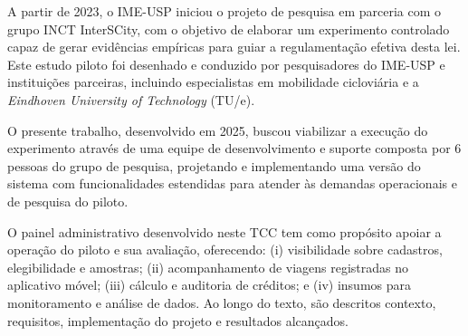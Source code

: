 A partir de 2023, o IME-USP iniciou o projeto de pesquisa em parceria com o
grupo INCT InterSCity, com o objetivo de elaborar um experimento controlado
capaz de gerar evidências empíricas para guiar a regulamentação efetiva desta
lei. Este estudo piloto foi desenhado e conduzido por pesquisadores do IME-USP
e instituições parceiras, incluindo especialistas em mobilidade cicloviária e a
\emph{Eindhoven University of Technology} (TU/e).

O presente trabalho, desenvolvido em 2025, buscou viabilizar a execução do
experimento através de uma equipe de desenvolvimento e
suporte composta por 6 pessoas do grupo de pesquisa, projetando e implementando
uma versão do sistema com funcionalidades estendidas para atender às
demandas operacionais e de pesquisa do piloto.

O painel administrativo desenvolvido neste TCC tem como propósito apoiar a
operação do piloto e sua avaliação, oferecendo: (i) visibilidade sobre
cadastros, elegibilidade e amostras; (ii) acompanhamento de viagens registradas
no aplicativo móvel; (iii) cálculo e auditoria de créditos; e (iv) insumos para
monitoramento e análise de dados. Ao longo do texto, são descritos contexto, requisitos, 
implementação do projeto e resultados alcançados.



